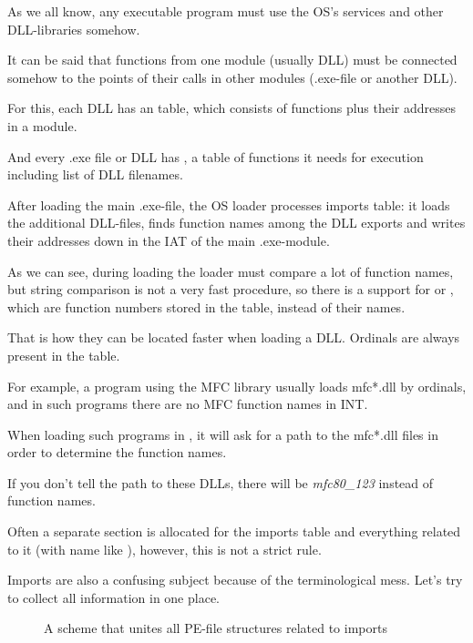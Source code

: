 \label{PE_exports_imports}
As we all know, any executable program must use the \ac{OS}'s services and other DLL-libraries somehow.

It can be said that functions from one module (usually DLL) must be connected somehow to the points of their
calls in other modules (.exe-file or another DLL).

For this, each DLL has an  table, which consists of functions plus their addresses in a module.

And every .exe file or DLL has , a table of functions it needs for execution including
list of DLL filenames.

After loading the main .exe-file, the \ac{OS} loader processes imports table:
it loads the additional DLL-files, finds function names
among the DLL exports and writes their addresses down in the \ac{IAT} of the main .exe-module.


As we can see, during loading the loader must compare a lot of function names, but string comparison is not a very
fast procedure, so there is a support for  or ,
which are function numbers stored in the table, instead of their names.

That is how they can be located faster when loading a DLL.
Ordinals are always present in the  table.

For example, a program using the \ac{MFC} library usually loads mfc*.dll by ordinals,
and in such programs there are no \ac{MFC} function names in \ac{INT}.

When loading such programs in \IDA, it will ask for a path to the mfc*.dll files
in order to determine the function names.

If you don't tell \IDA the path to these DLLs, there will be \emph{mfc80\_123} instead of function names.


Often a separate section is allocated for the imports table and everything related to it (with name like ),
however, this is not a strict rule.

Imports are also a confusing subject because of the terminological mess. Let's try to collect all information in one place.

\begin{figure}[H]
\centering
{}
\caption{
A scheme that unites all PE-file structures related to imports}
\end{figure}

